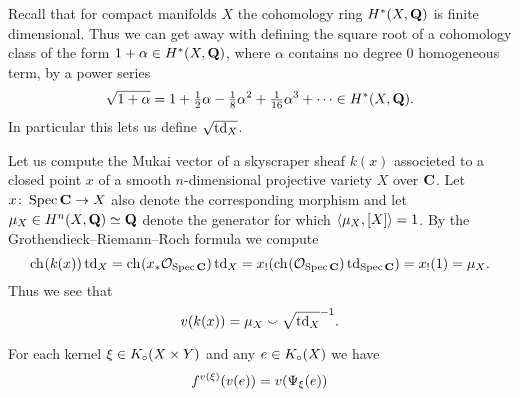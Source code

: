 \begin{remark}
    \label{sqrt of cohomology class}
    Recall that for compact manifolds $X$ the cohomology ring $H^{*}(X, \mathbf Q)$ is finite dimensional. Thus we can get away with defining the square root of a cohomology class of the form $1 + \alpha \in H^{*}(X, \mathbf Q)$, where $\alpha$ contains no degree $0$ homogeneous term, by a power series
    \begin{equation}
        \label{eq: sqrt power series}
        \sqrt{1 + \alpha} = 1 + \tfrac{1}{2}\alpha - \tfrac{1}{8}\alpha^2 + \tfrac{1}{16}\alpha^3 + \cdots \in H^{*}(X, \mathbf Q).
    \end{equation}
    In particular this lets us define $\sqrt{\operatorname{td}_{X}}$.
\end{remark}

\begin{example}
    \label{Mukai vector of skyscraper}
    Let us compute the Mukai vector of a skyscraper sheaf $k(x)$ associeted to a closed point $x$ of a smooth $n$-dimensional projective variety $X$ over $\mathbf C$. Let $x \colon \operatorname{Spec}\mathbf C \to X$ also denote the corresponding morphism and let
    $\mu_X \in H^{n}(X, \mathbf Q) \simeq \mathbf Q$ denote the generator for which $\langle \mu_X, [X] \rangle = 1$. By the Grothendieck--Riemann--Roch formula we compute
    \[
        \ch[](k(x))\tdclass{X} = \ch[]{x_*\struct{\spec{\C}}} \tdclass{X} = x_!(\ch[]{\struct{\spec{\C}}}\tdclass{\spec{\C}}) = x_!(1) = \mu_X.
    \]
    Thus we see that
    \[
        v(k(x)) = \mu_X \smallsmile \sqrt{\operatorname{td}_{X}}^{-1}.
    \]
\end{example}

\begin{proposition}
    \label{Mukai vector FM transform interaction}
    For each kernel $\xi \in K_{\circ}(X \times Y)$ and any $e \in K_{\circ}(X)$ we have
    \[
        f^{v(\xi)}(v(e)) = v(\Psi_{\xi}(e))
    \]  
\end{proposition}

